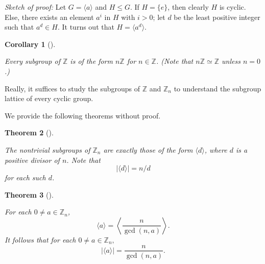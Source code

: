 \documentclass[10pt,]{book}
\theoremstyle{plain}
\newtheorem{theorem}{Theorem}[section]
\newtheorem{corollary}[theorem]{Corollary}
\theoremstyle{definition}
\theoremstyle{definition}
\theoremstyle{definition}
\theoremstyle{definition}
\numberwithin{equation}{section}
\def\Z{\mathbb{Z}}
\begin{document}
    \emph{Sketch of proof:} Let \(G=\langle a\rangle\) and \(H\leq G\). If \(H=\{e\}\), then clearly \(H\) is cyclic. Else, there exists an element \(a^i\) in \(H\) with \(i>0\); let \(d\) be the least positive integer such that \(a^d\in H\). It turns out that \(H=\langle a^d\rangle\).
\begin{corollary}[{}]\label{corollary-5}

        Every subgroup of \(\Z\) is of the form \(n\Z\) for \(n\in \Z\). (Note that \(n\Z\simeq \Z\) unless \(n=0\).)
\end{corollary}
\par

    Really, it suffices to study the subgroups of \(\Z\) and \(\Z_n\) to understand the subgroup lattice of every cyclic group.
\par

    We provide the following theorems without proof.
\begin{theorem}[{}]\label{znsubgps}

        The nontrivial subgroups of \(\Z_n\) are exactly those of the form \(\langle d\rangle\), where \(d\) is a positive divisor of \(n\). Note that %
\begin{equation*}
|\langle d\rangle |=n/d
\end{equation*}
 for each such \(d\).
\end{theorem}
\begin{theorem}[{}]\label{theorem-28}

        For each \(0\neq a\in \Z_n\), 
\begin{equation*}
\langle a\rangle =\left\langle \frac{n}{\gcd(n,a)}\right\rangle.
\end{equation*}
 It follows that for each \(0\neq a \in \Z_n,\) %
\begin{equation*}
|\langle a\rangle |=\frac{n}{\gcd(n,a)}.
\end{equation*}
%
\end{theorem}
\par
\end{document}
